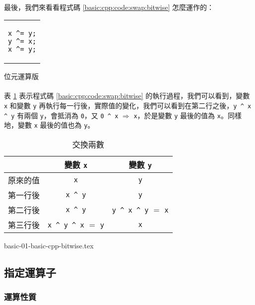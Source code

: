 \documentclass[12pt,a4paper,oneside]{article}
\begin{document}
\begin{CJK}{UTF8}{bkai}
\paragraph{}最後，我們來看看程式碼 \ref{basic:cpp:code:swap:bitwise} 怎麼運作的：

\begin{code}[h!]
\centering
\begin{tabular}{c}
\begin{lstlisting}
x ^= y;
y ^= x;
x ^= y;
\end{lstlisting}
\end{tabular}
\caption{位元運算版}
\label{basic:cpp:code:swap:bitwise}
\end{code}

\paragraph{}表 \ref{basic:cpp:table:swap:bitwise} 表示程式碼 \ref{basic:cpp:code:swap:bitwise} 的執行過程，我們可以看到，變數 \lstinline!x! 和變數 \lstinline!y! 再執行每一行後，實際值的變化，我們可以看到在第二行之後，\lstinline!y ^ x ^ y! 有兩個 \lstinline!y!，會抵消為 \lstinline!0!，又 \lstinline!0 ^ x! $\Rightarrow$ \lstinline!x!，於是變數 \lstinline!y! 最後的值為 \lstinline!x!。同樣地，變數 \lstinline!x! 最後的值也為 \lstinline!y!。

\begin{table}[h!]
\centering
\begin{tabular}{c|c|c}
 & 變數 \lstinline!x! & 變數 \lstinline!y!\\
\hline\hline
原來的值 & \lstinline!x! & \lstinline!y! \\
\hline
第一行後 & \lstinline!x ^ y! & \lstinline!y! \\
\hline
第二行後 & \lstinline!x ^ y! & \lstinline!y ^ x ^ y! $=$ \lstinline!x!\\
\hline
第三行後 & \lstinline!x ^ y ^ x! $=$ \lstinline!y! & \lstinline!x!\\
\end{tabular}
\caption{交換兩數}
\label{basic:cpp:table:swap:bitwise}
\end{table}

\label{basic:cpp:problem:bitwise}
{basic-01-basic-cpp-bitwise.tex}

\subsection{指定運算子}
\subsubsection{運算性質}


\end{CJK}
\end{document}
